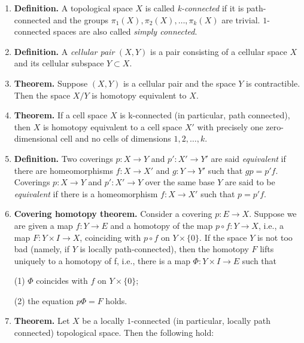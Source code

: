 \documentclass{ctexart}
\begin{document}
\begin{enumerate}
\item \textbf{Definition.} A topological space $X$ is called
  \textit{k-connected} if it is path-connected and the groups
  $\pi_1(X), \pi_2(X),\dots, \pi_k(X)$ are trivial. $1$-connected
  spaces are also called \textit{simply connected}.

\item \textbf{Definition.} A \textit{cellular pair} $(X,Y)$ is a pair
  consisting of a cellular space $X$ and its cellular subspace $Y
  \subset X$.

\item \textbf{Theorem.} Suppose $(X,Y)$ is a cellular pair and the
  space $Y$ is contractible. Then the space $X/Y$ is homotopy
  equivalent to $X$.

\item \textbf{Theorem.} If a cell space $X$ is k-connected (in
  particular, path connected), then $X$ is homotopy equivalent to a
  cell space $X'$ with precisely one zero-dimensional cell and no
  cells of dimensions $1,2,\dots,k$.

\item \textbf{Definition.} Two coverings $p : X \to Y$ and $p' : X'
  \to Y'$ are said \textit{equivalent} if there are homeomorphisms $f
  : X \to X'$ and $g : Y \to Y'$ such that $gp = p'f$. Coverings $p :
  X \to Y$ and $p' : X' \to Y$ over the same base $Y$ are said to be
  \textit{equivalent} if there is a homeomorphism $f : X \to X'$ such
  that $p = p'f$.

\item \textbf{Covering homotopy theorem.} Consider a covering $p : E
  \to X$. Suppose we are given a map $f : Y \to E$ and a homotopy of
  the map $p \circ f : Y \to X$, i.e., a map $F : Y \times I \to X$,
  coinciding with $p \circ f$ on $Y \times \{0\}$. If the space $Y$ is
  not too bad (namely, if $Y$ is locally path-connected), then the
  homotopy $F$ lifts uniquely to a homotopy of f, i.e., there is a map
  $\Phi : Y \times I \to E$ such that

(1) $\Phi$ coincides with $f$ on $Y \times \{0\}$;

(2) the equation $p\Phi = F$ holds.


\item \textbf{Theorem.} Let $X$ be a locally $1$-connected (in
  particular, locally path connected) topological space. Then the
  following hold:


\end{enumerate}
\end{document}

